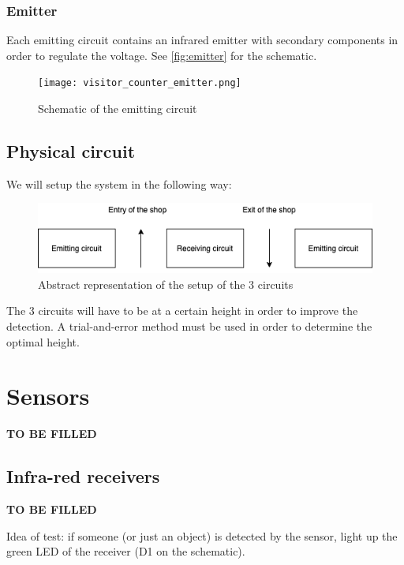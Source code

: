 \documentclass[a4paper, 11pt, oneside]{article}
\begin{document}
\subsubsection{Emitter}
Each emitting circuit contains an infrared emitter with secondary components in order to regulate the voltage. See \autoref{fig:emitter} for the schematic.
\begin{figure}[p]
    \centering
    \texttt{[image: visitor\_counter\_emitter.png]}
    \caption{Schematic of the emitting circuit}\label{fig:emitter}
\end{figure}

\subsection{Physical circuit}
We will setup the system in the following way:
\begin{figure}[H]
    \centering
    \includegraphics[scale=0.75]{diagram.png}
    \caption{Abstract representation of the setup of the 3 circuits}
\end{figure}
The 3 circuits will have to be at a certain height in order to improve the detection. A trial-and-error method must be used in order to determine the optimal height.



%
%

\section{Sensors}
\textbf{TO BE FILLED}

\subsection{Infra-red receivers}
\textbf{TO BE FILLED} \par
Idea of test: if someone (or just an object) is detected by the sensor, light up the green LED of the receiver (D1 on the schematic).
\end{document}
